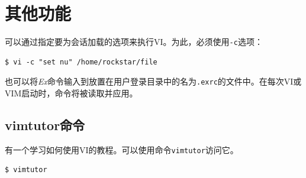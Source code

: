 \documentclass[12pt,a4paper,twoside]{ctexbook}
\begin{document}
\section{其他功能}

可以通过指定要为会话加载的选项来执行VI。为此，必须使用\texttt{-c}选项：

\begin{verbatim}
$ vi -c "set nu" /home/rockstar/file
\end{verbatim}

也可以将\textit{Ex}命令输入到放置在用户登录目录中的名为\texttt{.exrc}的文件中。在每次VI或VIM启动时，命令将被读取并应用。

\subsection{vimtutor命令}

有一个学习如何使用VI的教程。可以使用命令\texttt{vimtutor}访问它。

\begin{verbatim}
$ vimtutor
\end{verbatim}
\end{document}
